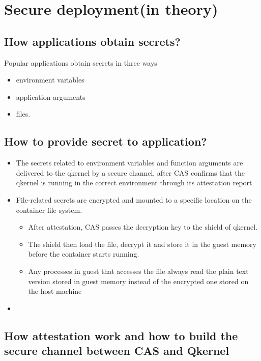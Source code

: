 \section{Secure deployment(in theory)}

\subsection{How applications obtain secrets?}

Popular applications obtain secrets in three ways
\begin{itemize}
    \item  environment variables
    \item  application arguments
    \item  files.
\end{itemize}

\subsection{How to provide secret to application?}

\begin{itemize}
    \item  The secrets related to environment variables and function arguments are  delivered to the qkernel by a secure channel, after CAS confirms that the qkernel is running in the correct environment through its attestation report
    \item  File-related secrets are encrypted and mounted to a specific location on the container file system.
    \begin{itemize}
        \item After attestation, CAS passes the decryption key to the shield of qkernel.
        \item The shield then load the file, decrypt it and store it in the guest memory before the container starts running.
        \item Any processes in guest that accesses the file always read the plain text version stored in guest memory instead of the encrypted one stored on the host machine
      \end{itemize}
    \item
\end{itemize}

\subsection{How attestation work and how to build the secure channel between CAS and Qkernel}

